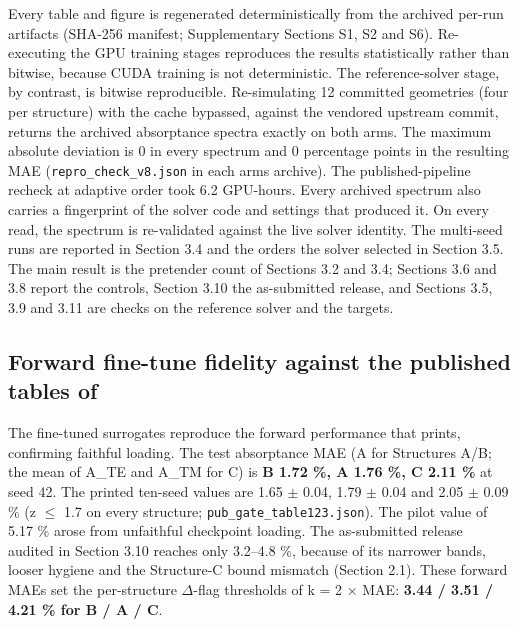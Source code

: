 \documentclass[11pt,a4paper]{article}
\begin{document}
Every table and figure is regenerated deterministically from the archived per-run
artifacts (SHA-256 manifest; Supplementary Sections S1, S2 and S6). Re-executing the GPU
training stages reproduces the results statistically rather than bitwise, because CUDA
training is not deterministic. The reference-solver stage, by contrast, is bitwise
reproducible. Re-simulating 12 committed geometries (four per structure) with the cache
bypassed, against the vendored upstream commit, returns the archived absorptance spectra
exactly on both arms. The maximum absolute deviation is 0 in every spectrum and 0
percentage points in the resulting MAE (\texttt{repro\_\allowbreak{}check\_\allowbreak{}v8.\allowbreak{}json} in each arm\textquotesingle s archive). The
published-pipeline recheck at adaptive order took 6.2 GPU-hours. Every archived spectrum
also carries a fingerprint of the solver code and settings that produced it. On every
read, the spectrum is re-validated against the live solver identity. The multi-seed runs are reported in Section 3.4 and the orders the solver selected in Section 3.5. The main result is the pretender count of Sections 3.2 and 3.4; Sections 3.6 and 3.8 report the controls, Section 3.10 the as-submitted release, and Sections 3.5, 3.9 and 3.11 are checks on the reference solver and the targets.

\subsection{\texorpdfstring{Forward fine-tune fidelity against the published tables of \cite{choi20261}}{Forward fine-tune fidelity against the published tables of }}\label{sec:3.1}

The fine-tuned surrogates reproduce the forward performance that \cite{choi20261} prints, confirming
faithful loading. The test absorptance MAE (A for Structures A/B; the mean of A\_TE and
A\_TM for C) is \textbf{B 1.72 \%, A 1.76 \%, C 2.11 \%} at seed 42. The printed ten-seed values
are 1.65 \ensuremath{\pm} 0.04, 1.79 \ensuremath{\pm} 0.04 and 2.05 \ensuremath{\pm} 0.09 \% (\textbar z\textbar{} \ensuremath{\leq} 1.7 on every structure;
\texttt{pub\_\allowbreak{}gate\_\allowbreak{}table123.\allowbreak{}json}). The pilot value of 5.17 \% arose from unfaithful checkpoint
loading. The as-submitted release audited in Section 3.10 reaches only 3.2--4.8 \%, because
of its narrower bands, looser hygiene and the Structure-C bound mismatch (Section 2.1).
These forward MAEs set the per-structure \ensuremath{\Delta}-flag thresholds of k = 2 \ensuremath{\times} MAE:
\textbf{3.44 / 3.51 / 4.21 \% for B / A / C}.
\end{document}

